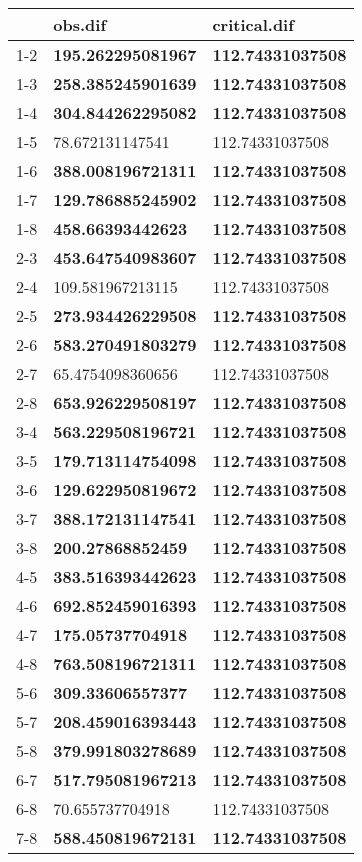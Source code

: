 \begin{table}[ht]
\centering
\begin{tabular}{rll}
  \hline
 & obs.dif & critical.dif \\ 
  \hline
1-2 & \textbf{195.262295081967} & \textbf{112.74331037508} \\ 
  1-3 & \textbf{258.385245901639} & \textbf{112.74331037508} \\ 
  1-4 & \textbf{304.844262295082} & \textbf{112.74331037508} \\ 
  1-5 & 78.672131147541 & 112.74331037508 \\ 
  1-6 & \textbf{388.008196721311} & \textbf{112.74331037508} \\ 
  1-7 & \textbf{129.786885245902} & \textbf{112.74331037508} \\ 
  1-8 & \textbf{458.66393442623} & \textbf{112.74331037508} \\ 
  2-3 & \textbf{453.647540983607} & \textbf{112.74331037508} \\ 
  2-4 & 109.581967213115 & 112.74331037508 \\ 
  2-5 & \textbf{273.934426229508} & \textbf{112.74331037508} \\ 
  2-6 & \textbf{583.270491803279} & \textbf{112.74331037508} \\ 
  2-7 & 65.4754098360656 & 112.74331037508 \\ 
  2-8 & \textbf{653.926229508197} & \textbf{112.74331037508} \\ 
  3-4 & \textbf{563.229508196721} & \textbf{112.74331037508} \\ 
  3-5 & \textbf{179.713114754098} & \textbf{112.74331037508} \\ 
  3-6 & \textbf{129.622950819672} & \textbf{112.74331037508} \\ 
  3-7 & \textbf{388.172131147541} & \textbf{112.74331037508} \\ 
  3-8 & \textbf{200.27868852459} & \textbf{112.74331037508} \\ 
  4-5 & \textbf{383.516393442623} & \textbf{112.74331037508} \\ 
  4-6 & \textbf{692.852459016393} & \textbf{112.74331037508} \\ 
  4-7 & \textbf{175.05737704918} & \textbf{112.74331037508} \\ 
  4-8 & \textbf{763.508196721311} & \textbf{112.74331037508} \\ 
  5-6 & \textbf{309.33606557377} & \textbf{112.74331037508} \\ 
  5-7 & \textbf{208.459016393443} & \textbf{112.74331037508} \\ 
  5-8 & \textbf{379.991803278689} & \textbf{112.74331037508} \\ 
  6-7 & \textbf{517.795081967213} & \textbf{112.74331037508} \\ 
  6-8 & 70.655737704918 & 112.74331037508 \\ 
  7-8 & \textbf{588.450819672131} & \textbf{112.74331037508} \\ 
   \hline
\end{tabular}
\end{table}
